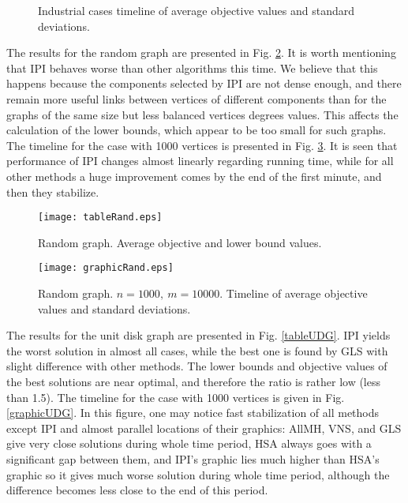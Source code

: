 \documentclass[runningheads]{llncs}
\begin{document}
\begin{figure}[!hbtp]
\centering
{} \hfill
{} \hfill
\caption{Industrial cases timeline of average objective values and standard deviations.} \label{graphicInd}
\end{figure}

The results for the random graph are presented in Fig. \ref{tableRand}. It is worth mentioning that IPI behaves worse than other algorithms this time. We believe that this happens because the components selected by IPI are not dense enough, and there remain more useful links between vertices of different components than for the graphs of the same size but less balanced vertices degrees values. This affects the calculation of the lower bounds, which appear to be too small for such graphs. The timeline for the case with 1000 vertices is presented in Fig. \ref{graphicRand}. It is seen that performance of IPI changes almost linearly regarding running time, while for all other methods a huge improvement comes by the end of the first minute, and then they stabilize.

\begin{figure}
\centering
\texttt{[image: tableRand.eps]}
\caption{Random graph. Average objective and lower bound values.} \label{tableRand}
\end{figure}

\begin{figure}
\centering
\texttt{[image: graphicRand.eps]}
\caption{Random graph. $n = 1000,\:m=10000$. Timeline of average objective values and standard deviations.} \label{graphicRand}
\end{figure}

The results for the unit disk graph are presented in Fig. \ref{tableUDG}. IPI yields the worst solution in almost all cases, while the best one is found by GLS with slight difference with other methods. The lower bounds and objective values of the best solutions are near optimal, and therefore the ratio is rather low (less than 1.5). The timeline for the case with 1000 vertices is given in Fig. \ref{graphicUDG}. In this figure, one may notice fast stabilization of all methods except IPI and almost parallel locations of their graphics: AllMH, VNS, and GLS give very close solutions during whole time period, HSA always goes with a significant gap between them, and IPI’s graphic lies much higher than HSA’s graphic so it gives much worse solution during whole time period, although the difference becomes less close to the end of this period.
\end{document}
